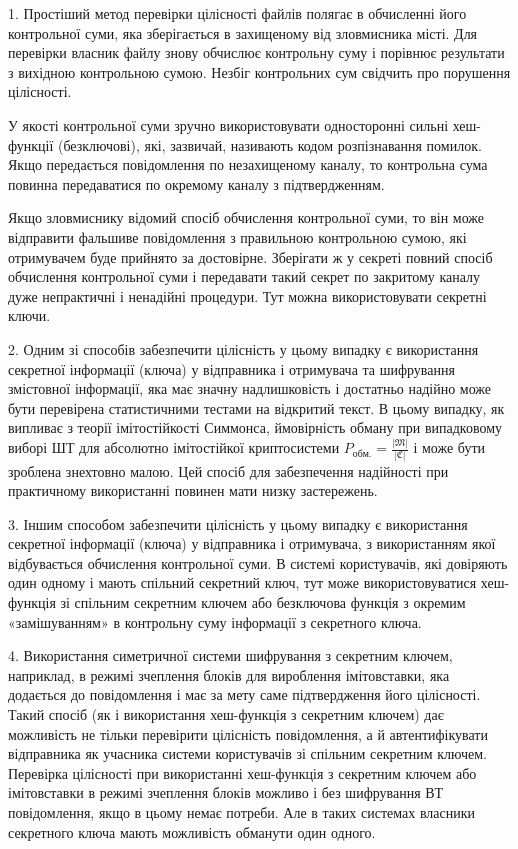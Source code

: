 1. Простіший метод перевірки цілісності файлів полягає в обчисленні
його контрольної суми, яка зберігається в захищеному від зловмисника місті.
Для перевірки власник файлу знову обчислює контрольну суму і порівнює
результати з вихідною контрольною сумою. Незбіг контрольних сум свідчить
про порушення цілісності.

У якості контрольної суми зручно використовувати односторонні сильні
хеш-функції (безключові), які, зазвичай, називають кодом розпізнавання
помилок. Якщо передається повідомлення по незахищеному каналу, то
контрольна сума повинна передаватися по окремому каналу з підтвердженням.

Якщо зловмиснику відомий спосіб обчислення контрольної суми, то він
може відправити фальшиве повідомлення з правильною контрольною сумою,
які отримувачем буде прийнято за достовірне. Зберігати ж у секреті повний
спосіб обчислення контрольної суми і передавати такий секрет по закритому
каналу дуже непрактичні і ненадійні процедури. Тут можна використовувати
секретні ключи.

2. Одним зі способів забезпечити цілісність у цьому випадку є
використання секретної інформації (ключа) у відправника і отримувача та
шифрування змістовної інформації, яка має значну надлишковість і достатньо
надійно може бути перевірена статистичними тестами на відкритий текст. В
цьому випадку, як випливає з теорії імітостійкості Симмонса, ймовірність
обману при випадковому виборі ШТ для абсолютно імітостійкої криптосистеми
$P_{\text{обм.}} = \frac{|\mathfrak{M}|}{|\mathfrak{C}|}$
і може бути зроблена знехтовно малою. Цей спосіб для
забезпечення надійності при практичному використанні повинен мати низку
застережень.

3. Іншим способом забезпечити цілісність у цьому випадку є
використання секретної інформації (ключа) у відправника і отримувача, з
використанням якої відбувається обчислення контрольної суми. В системі
користувачів, які довіряють один одному і мають спільний секретний ключ, тут
може використовуватися хеш-функція зі спільним секретним ключем або
безключова функція з окремим «замішуванням» в контрольну суму інформації
з секретного ключа.

4. Використання симетричної системи шифрування з секретним ключем,
наприклад, в режимі зчеплення блоків для вироблення імітовставки, яка
додається до повідомлення і має за мету саме підтвердження його цілісності.
Такий спосіб (як і використання хеш-функція з секретним ключем) дає
можливість не тільки перевірити цілісність повідомлення, а й автентифікувати
відправника як учасника системи користувачів зі спільним секретним ключем.
Перевірка цілісності при використанні хеш-функція з секретним ключем або
імітовставки в режимі зчеплення блоків можливо і без шифрування ВТ
повідомлення, якщо в цьому немає потреби. Але в таких системах власники
секретного ключа мають можливість обманути один одного.

